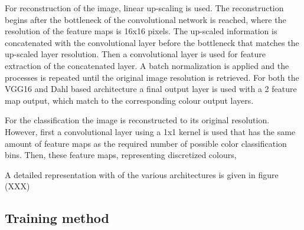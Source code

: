For reconstruction of the image, linear up-scaling is used. The reconstruction begins after the bottleneck of the convolutional network is reached, where the resolution of the feature maps is 16x16 pixels. The up-scaled information is concatenated with the convolutional layer before the bottleneck that matches the up-scaled layer resolution. Then a convolutional layer is used for feature extraction of the concatenated layer. A batch normalization is applied and the processes is repeated until the original image resolution is retrieved. For both the VGG16 and Dahl based architecture a final output layer is used with a 2 feature map output, which match to the corresponding colour output layers.

For the classification the image is reconstructed to its original resolution. However, first a convolutional layer using a 1x1 kernel is used that has the same amount of feature maps as the required number of possible color classification bins. Then, these feature maps, representing discretized colours, %

A detailed representation with of the various architectures is given in figure (XXX)



\subsection{Training method}